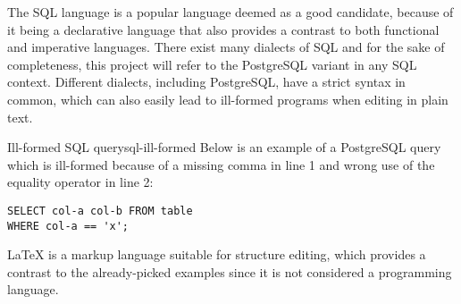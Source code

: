 \documentclass{article}
\begin{document}
The SQL language is a popular language deemed as a good candidate, because of it being a declarative language that also provides a contrast to both functional and imperative languages. There exist many dialects of SQL and for the sake of completeness, this project will refer to the PostgreSQL\cite{postgresql-about} variant in any SQL context. Different dialects, including PostgreSQL, have a strict syntax in common, which can also easily lead to ill-formed programs when editing in plain text.
\begin{example}{Ill-formed SQL query}{sql-ill-formed}
Below is an example of a PostgreSQL query which is ill-formed because of a missing comma in line 1 and wrong use of the equality operator in line 2:
\begin{lstlisting}
SELECT col-a col-b FROM table
WHERE col-a == 'x';
\end{lstlisting}
\end{example}

\LaTeX\cite{latex-about} is a markup language suitable for structure editing, which provides a contrast to the already-picked examples since it is not considered a programming language.

\printbibliography
\end{document}
